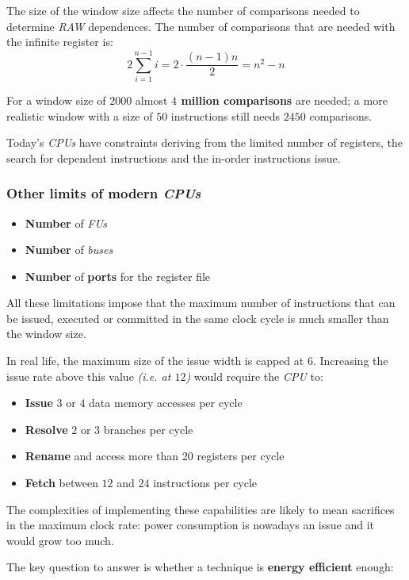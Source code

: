 \documentclass[english]{article}
\begin{document}
The size of the window size affects the number of comparisons needed to determine \textit{RAW} dependences.
The number of comparisons that are needed with the infinite register is:
\[ \displaystyle 2 \sum^{n-1}_{i=1} i = 2 \cdot \dfrac{(n-1)n}{2} = n^2 - n \]

For a window size of \(2000\) almost \textbf{\(4\) million comparisons} are needed;
a more realistic window with a size of \(50\) instructions still needs \(2450\) comparisons.

Today's \textit{CPUs} have constraints deriving from the limited number of registers, the search for dependent instructions and the in-order instructions issue.

\subsubsection{Other limits of modern \textit{CPUs}}

\begin{itemize}
  \item \textbf{Number} of \textit{FUs}
  \item \textbf{Number} of \textit{buses}
  \item \textbf{Number} of \textbf{ports} for the register file
\end{itemize}

All these limitations impose that the maximum number of instructions that can be issued, executed or committed in the same clock cycle is much smaller than the window size.

In real life, the maximum size of the issue width is capped at \(6\).
Increasing the issue rate above this value \textit{(i.e. at \(12\))} would require the \textit{CPU} to:
\begin{itemize}
  \item \textbf{Issue} \(3\) or \(4\) data memory accesses per cycle
  \item \textbf{Resolve} \(2\) or \(3\) branches per cycle
  \item \textbf{Rename} and access more than \(20\) registers per cycle
  \item \textbf{Fetch} between \(12\) and \(24\) instructions per cycle
\end{itemize}

The complexities of implementing these capabilities are likely to mean sacrifices in the maximum clock rate:
power consumption is nowadays an issue and it would grow too much.

The key question to answer is whether a technique is \textbf{energy efficient} enough:
\end{document}
